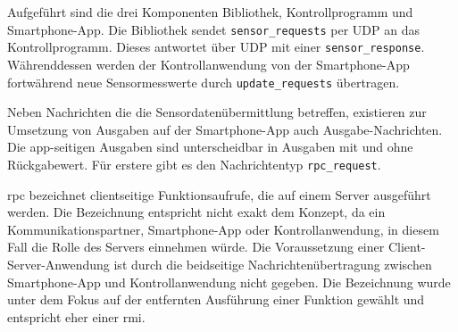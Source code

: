 \documentclass[11pt,a4paper]{report}
\begin{document}
Aufgeführt sind die drei Komponenten Bibliothek, Kontrollprogramm und Smartphone-App.
Die Bibliothek sendet \texttt{sensor\_requests} per UDP an das Kontrollprogramm.
Dieses antwortet über UDP mit einer \texttt{sensor\_response}.
Währenddessen werden der Kontrollanwendung von der Smartphone-App fortwährend neue Sensormesswerte durch \texttt{update\_requests} übertragen.

Neben Nachrichten die die Sensordatenübermittlung betreffen, existieren zur Umsetzung von Ausgaben auf der Smartphone-App auch Ausgabe-Nachrichten.
Die app-seitigen Ausgaben sind unterscheidbar in Ausgaben mit und ohne Rückgabewert.
Für erstere gibt es den Nachrichtentyp \texttt{rpc\_request}.

\acrfull{rpc} bezeichnet clientseitige Funktionsaufrufe, die auf einem Server ausgeführt werden.
Die Bezeichnung entspricht nicht exakt dem Konzept, da ein Kommunikationspartner, Smartphone-App oder Kontrollanwendung, in diesem Fall die Rolle des Servers einnehmen würde.
Die Voraussetzung einer Client-Server-Anwendung ist durch die beidseitige Nachrichtenübertragung zwischen Smartphone-App und Kontrollanwendung nicht gegeben.
Die Bezeichnung wurde unter dem Fokus auf der entfernten Ausführung einer Funktion gewählt und entspricht eher einer \acrfull{rmi}.
\end{document}

